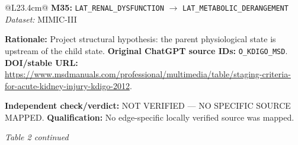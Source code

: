 \begin{tabular}{@{}L{23.4cm}@{}}
\addlinespace[2pt]
\midrule
\textbf{M35:} \nolinkurl{LAT_RENAL_DYSFUNCTION} $\rightarrow$ \nolinkurl{LAT_METABOLIC_DERANGEMENT} \hfill \textit{Dataset:} MIMIC-III\par\textbf{Rationale:} Project structural hypothesis: the parent physiological state is upstream of the child state. \textbf{Original ChatGPT source IDs:} \nolinkurl{O_KDIGO_MSD}. \textbf{DOI/stable URL:} \url{https://www.msdmanuals.com/professional/multimedia/table/staging-criteria-for-acute-kidney-injury-kdigo-2012}.\par\textbf{Independent check/verdict:} NOT VERIFIED --- NO SPECIFIC SOURCE MAPPED. \textbf{Qualification:} No edge-specific locally verified source was mapped. \\
\addlinespace[2pt]
\midrule
\bottomrule
\end{tabular}
\clearpage
\textit{Table 2 continued}\par
